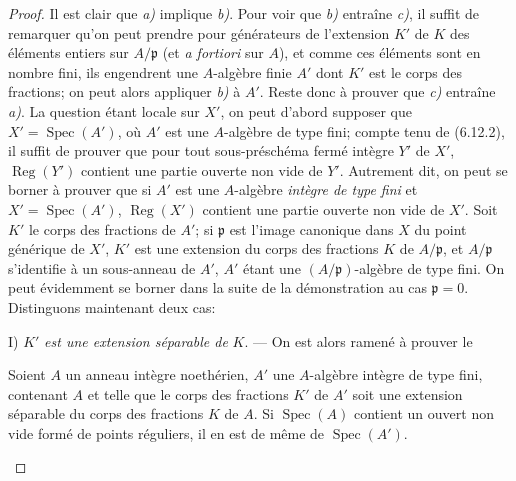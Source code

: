 \begin{proof}
Il est clair que \emph{a)} implique \emph{b)}. Pour voir que \emph{b)} entraîne \emph{c)}, il suffit de
remarquer qu'on peut prendre pour générateurs de l'extension $K'$ de $K$
des éléments entiers sur $A/\mathfrak p$ (et \emph{a fortiori} sur $A$), et comme
ces éléments sont en nombre fini, ils engendrent une $A$-algèbre finie
$A'$ dont $K'$ est le corps des fractions; on peut alors appliquer \emph{b)} à
$A'$. Reste donc à prouver que \emph{c)} entraîne \emph{a)}. La question étant locale sur
$X'$, on peut d'abord supposer que $X'=\operatorname{Spec}(A')$, où $A'$
est une $A$-algèbre de type fini; compte tenu de (6.12.2), il suffit de
prouver que pour tout sous-préschéma fermé intègre $Y'$ de $X'$,
$\operatorname{Reg}(Y')$ contient une partie ouverte non vide de $Y'$.
Autrement dit, on peut se borner à prouver que si $A'$ est une $A$-algèbre
\emph{intègre de type fini} et $X'=\operatorname{Spec}(A')$,
$\operatorname{Reg}(X')$ contient une partie ouverte non vide de $X'$.
Soit $K'$ le corps des fractions de $A'$; si $\mathfrak p$ est l'image
canonique dans $X$ du point générique de $X'$, $K'$ est une extension du
corps des fractions $K$ de $A/\mathfrak p$, et $A/\mathfrak p$
s'identifie à un sous-anneau de $A'$, $A'$ étant une
$(A/\mathfrak p)$-algèbre de type fini. On peut évidemment se borner dans
la suite de la démonstration au cas $\mathfrak p=0$. Distinguons maintenant
deux cas:

I) $K'$ \emph{est une extension séparable de} $K$. --- On est alors ramené à
prouver le

\begin{lemma}[6.12.4.1]
\label{IV.2.s6.12.4.1-fr}
Soient $A$ un anneau intègre noethérien, $A'$ une $A$-algèbre intègre de
type fini, contenant $A$ et telle que le corps des fractions $K'$ de $A'$
soit une extension séparable du corps des fractions $K$ de $A$. Si
$\operatorname{Spec}(A)$ contient un ouvert non vide formé de points
réguliers, il en est de même de $\operatorname{Spec}(A')$.
\end{lemma}


\end{proof}
